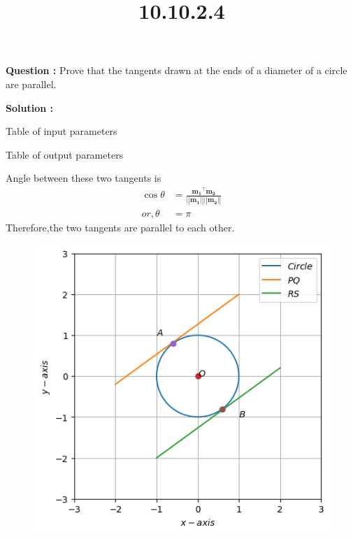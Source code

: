 \documentclass[12pt]{article}
\let\vec\mathbf
\providecommand{\norm}[1]{\ensuremath{\lvert|#1\rvert|}}
\begin{document}
\title{\textbf{10.10.2.4}}
\date{}
\maketitle
\textbf{Question :} Prove that the tangents drawn at the ends of a diameter of a circle are parallel.

\textbf{Solution :}
\begin{table}[H]
    \centering
	
\caption{Table of input parameters}
    \label{tab:10.10.2.4.1}
\end{table}
\begin{table}[H]
    \centering
	
  \caption{Table of output parameters}
    \label{tab:10.10.2.4.2}
\end{table}
Angle between these two tangents is
\begin{align}
    \cos{\theta}&=\frac{\vec{m_1}^{\top}\vec{m_2}}{\vec{\norm{m_1}\norm{m_2}}}\\
    or,\theta &= \pi
\end{align}
Therefore,the two tangents are parallel to each other.
\begin{figure}[H]                           
	\centering                     
	\includegraphics[width=\columnwidth]{fig/10.10.2.4.png}                       
	\caption{}               
	\label{10.10.2.4}
\end{figure}
\end{document}
